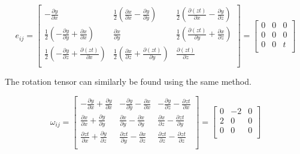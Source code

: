 \documentclass[11pt,a4paper,english]{article}
\numberwithin{equation}{section}
\begin{document}
\[
	e_{ij}=
	\begin{bmatrix}
    	   -\frac{\partial y}{\partial x} & 
	       \frac{1}{2}(\frac{\partial x}{\partial x} - \frac{\partial y}{\partial y}) & 
	       \frac{1}{2}(\frac{\partial (zt)}{\partial x} - \frac{\partial y}{\partial z}) \\[0.3em]
       
  	     \frac{1}{2}(-\frac{\partial y}{\partial y} + \frac{\partial x}{\partial x}) & 
  	     \frac{\partial x}{\partial y} & 
  	     \frac{1}{2}(\frac{\partial (zt)}{\partial y} + \frac{\partial x}{\partial z}) \\[0.3em]
       
  	     \frac{1}{2}(-\frac{\partial y}{\partial z} + \frac{\partial (zt)}{\partial x}) & 
  	     \frac{1}{2}(\frac{\partial x}{\partial z} + \frac{\partial (zt)}{\partial y}) & 
  	     \frac{\partial (zt)}{\partial z} \\[0.3em]
     \end{bmatrix}     
     =\begin{bmatrix}
       0 & 
       0 & 
       0\\[0.3em]
       
       0 & 
       0 & 
       0\\[0.3em]
       
       0 & 
       0 & 
       t\\[0.3em]
     \end{bmatrix}\]
     
The rotation tensor can similarly be found using the same method.     
     
     \[\omega_{ij}=
\begin{bmatrix}
       - \frac{\partial y}{\partial x} + \frac{\partial y}{\partial x} 	& 
       - \frac{\partial y}{\partial y} - \frac{\partial x}{\partial x}	& 
       - \frac{\partial y}{\partial z} - \frac{\partial zt}{\partial x}	\\[0.3em]
       
       \frac{\partial x}{\partial x} + \frac{\partial y}{\partial y} & 
       \frac{\partial x}{\partial y} - \frac{\partial x}{\partial y} & 
       \frac{\partial x}{\partial z} - \frac{\partial zt}{\partial y} \\[0.3em]
      
       \frac{\partial zt}{\partial x} + \frac{\partial y}{\partial z} & 
       \frac{\partial zt}{\partial y} - \frac{\partial x}{\partial z} & 
       \frac{\partial zt}{\partial z} - \frac{\partial zt}{\partial z} \\[0.3em]
     \end{bmatrix}
     =\begin{bmatrix}
       0 & 
       -2 & 
       0\\[0.3em]
       
       2 & 
       0 & 
       0\\[0.3em]
       
       0 & 
       0 & 
       0\\[0.3em]
     \end{bmatrix}\]
\end{document}
